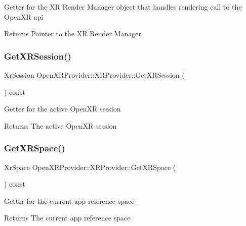 Getter for the XR Render Manager object that handles rendering call to the Open\+XR api \begin{DoxyReturn}{Returns}
Pointer to the XR Render Manager 
\end{DoxyReturn}
\mbox{\label{class_open_x_r_provider_1_1_x_r_provider_adfd13c0c76ff0fec35674d343ba55c06}} 
\subsubsection{\texorpdfstring{GetXRSession()}{GetXRSession()}}
{\footnotesize\ttfamily Xr\+Session Open\+X\+R\+Provider\+::\+X\+R\+Provider\+::\+Get\+X\+R\+Session (\begin{DoxyParamCaption}{ }\end{DoxyParamCaption}) const\hspace{0.3cm}{\ttfamily [inline]}}

Getter for the active Open\+XR session \begin{DoxyReturn}{Returns}
The active Open\+XR session 
\end{DoxyReturn}
\mbox{\label{class_open_x_r_provider_1_1_x_r_provider_a53db40884126aaa44f32953fa889fb76}} 
\subsubsection{\texorpdfstring{GetXRSpace()}{GetXRSpace()}}
{\footnotesize\ttfamily Xr\+Space Open\+X\+R\+Provider\+::\+X\+R\+Provider\+::\+Get\+X\+R\+Space (\begin{DoxyParamCaption}{ }\end{DoxyParamCaption}) const\hspace{0.3cm}{\ttfamily [inline]}}

Getter for the current app reference space \begin{DoxyReturn}{Returns}
The current app reference space 
\end{DoxyReturn}
\mbox{\label{class_open_x_r_provider_1_1_x_r_provider_a8b2a2dd1e3497a8395b496be5eff6f2c}} 
